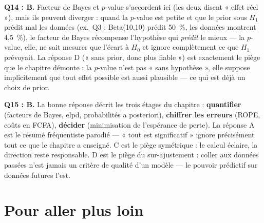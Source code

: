 \documentclass[11pt,a4paper]{article}
\begin{document}
\begin{corrigebox}
\textbf{Q14 : B.} Facteur de Bayes et $p$-value s'accordent ici (les deux
disent « effet réel »), mais ils peuvent diverger : quand la $p$-value est
petite et que le prior sous $H_1$ prédit mal les données (ex.\ Q3 :
Beta(10,10) prédit 50~\%, les données montrent 4,5~\%), le facteur de Bayes
récompense l'hypothèse qui \emph{prédit} le mieux --- la $p$-value, elle, ne
sait mesurer que l'écart à $H_0$ et ignore complètement ce que $H_1$
prévoyait. La réponse D (« sans prior, donc plus fiable ») est exactement le
piège que le chapitre démonte : la $p$-value n'est pas « sans hypothèse »,
elle suppose implicitement que tout effet possible est aussi plausible ---
ce qui est déjà un choix de prior.

\textbf{Q15 : B.} La bonne réponse décrit les trois étages du chapitre :
\textbf{quantifier} (facteurs de Bayes, elpd, probabilités a posteriori),
\textbf{chiffrer les erreurs} (ROPE, coûts en FCFA), \textbf{décider}
(minimisation de l'espérance de perte). La réponse A est le résumé
fréquentiste parodié --- « tout est significatif » ignore précisément tout ce
que le chapitre a enseigné. C est le piège symétrique : le calcul éclaire,
la direction reste responsable. D est le piège du sur-ajustement : coller
aux données passées n'est jamais un critère de qualité d'un modèle --- le
pouvoir prédictif sur données futures l'est.
\end{corrigebox}

\section{Pour aller plus loin}
\end{document}
